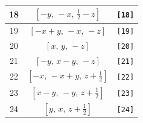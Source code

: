 \documentclass[fleqn,8pt]{jsarticle}
\begin{document}
\begin{longtable}{ccc}
18 & $\left[ - y,\, - x,\, \frac{1}{2} - z \right]$ & {\tt [18]} \\ \hline
19 & $\left[ - x + y,\, - x,\, - z \right]$ & {\tt [19]} \\ \hline
20 & $\left[ x,\, y,\, - z \right]$ & {\tt [20]} \\ \hline
21 & $\left[ - y,\, x - y,\, - z \right]$ & {\tt [21]} \\ \hline
22 & $\left[ - x,\, - x + y,\, z + \frac{1}{2} \right]$ & {\tt [22]} \\ \hline
23 & $\left[ x - y,\, - y,\, z + \frac{1}{2} \right]$ & {\tt [23]} \\ \hline
24 & $\left[ y,\, x,\, z + \frac{1}{2} \right]$ & {\tt [24]} \\
\end{longtable}
\end{document}
